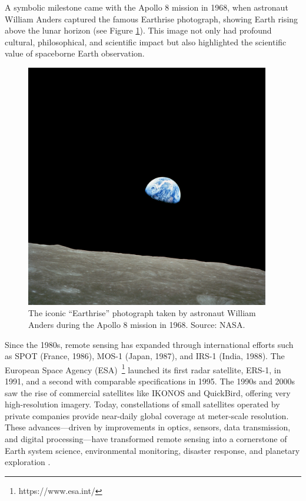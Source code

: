 A symbolic milestone came with the Apollo 8 mission in 1968, when astronaut William Anders captured the famous Earthrise photograph, showing Earth rising above the lunar horizon (see Figure \ref{fig:earthrise}). This image not only had profound cultural, philosophical, and scientific impact but also highlighted the scientific value of spaceborne Earth observation.
\begin{figure}[h!]
  \centering
  \includegraphics[width=0.95\textwidth]{img/earthrise.jpg}
  \caption[“Earthrise” photograph (Apollo 8, 1968)]{The iconic “Earthrise” photograph taken by astronaut William Anders during the Apollo 8 mission in 1968. Source: NASA.}
  \label{fig:earthrise}
\end{figure}
Since the 1980s, remote sensing has expanded through international efforts such as SPOT (France, 1986), MOS-1 (Japan, 1987), and IRS-1 (India, 1988). The European Space Agency (ESA)~\footnote{https://www.esa.int/} launched its first radar satellite, ERS-1, in 1991, and a second with comparable specifications in 1995. The 1990s and 2000s saw the rise of commercial satellites like IKONOS and QuickBird, offering very high-resolution imagery. Today, constellations of small satellites operated by private companies provide near-daily global coverage at meter-scale resolution. These advances—driven by improvements in optics, sensors, data transmission, and digital processing—have transformed remote sensing into a cornerstone of Earth system science, environmental monitoring, disaster response, and planetary exploration \cite{book_Satellite_RS}.

